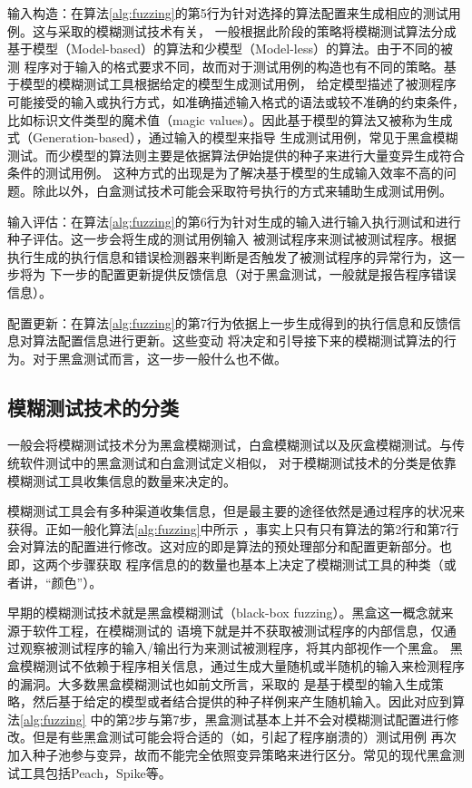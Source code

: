 \documentclass[bachelor]{njupthesis}
\begin{document}
输入构造：在算法\ref{alg:fuzzing}的第5行为针对选择的算法配置来生成相应的测试用例。这与采取的模糊测试技术有关，
一般根据此阶段的策略将模糊测试算法分成基于模型（Model-based）的算法和少模型（Model-less）的算法。由于不同的被测
程序对于输入的格式要求不同，故而对于测试用例的构造也有不同的策略。基于模型的模糊测试工具根据给定的模型生成测试用例，
给定模型描述了被测程序可能接受的输入或执行方式，如准确描述输入格式的语法或较不准确的约束条件，
比如标识文件类型的魔术值（magic values）。因此基于模型的算法又被称为生成式（Generation-based），通过输入的模型来指导
生成测试用例，常见于黑盒模糊测试。而少模型的算法则主要是依据算法伊始提供的种子来进行大量变异生成符合条件的测试用例。
这种方式的出现是为了解决基于模型的生成输入效率不高的问题。除此以外，白盒测试技术可能会采取符号执行的方式来辅助生成测试用例。

输入评估：在算法\ref{alg:fuzzing}的第6行为针对生成的输入进行输入执行测试和进行种子评估。这一步会将生成的测试用例输入
被测试程序来测试被测试程序。根据执行生成的执行信息和错误检测器来判断是否触发了被测试程序的异常行为，这一步将为
下一步的配置更新提供反馈信息（对于黑盒测试，一般就是报告程序错误信息）。

配置更新：在算法\ref{alg:fuzzing}的第7行为依据上一步生成得到的执行信息和反馈信息对算法配置信息进行更新。这些变动
将决定和引导接下来的模糊测试算法的行为。对于黑盒测试而言，这一步一般什么也不做。

\subsection{模糊测试技术的分类}
一般会将模糊测试技术分为黑盒模糊测试，白盒模糊测试以及灰盒模糊测试。与传统软件测试中的黑盒测试和白盒测试\cite{myers2011art}定义相似，
对于模糊测试技术的分类是依靠模糊测试工具收集信息的数量来决定的\cite{manes2019art}。

模糊测试工具会有多种渠道收集信息，但是最主要的途径依然是通过程序的状况来获得。正如一般化算法\ref{alg:fuzzing}中所示
，事实上只有只有算法的第2行和第7行会对算法的配置进行修改。这对应的即是算法的预处理部分和配置更新部分。也即，这两个步骤获取
程序信息的的数量也基本上决定了模糊测试工具的种类（或者讲，“颜色”）。

早期的模糊测试技术就是黑盒模糊测试\cite{beizer1995black}（black-box fuzzing）。黑盒这一概念就来源于软件工程，在模糊测试的
语境下就是并不获取被测试程序的内部信息，仅通过观察被测试程序的输入/输出行为来测试被测程序，将其内部视作一个黑盒。
黑盒模糊测试不依赖于程序相关信息，通过生成大量随机或半随机的输入来检测程序的漏洞。大多数黑盒模糊测试也如前文所言，采取的
是基于模型的输入生成策略，然后基于给定的模型或者结合提供的种子样例来产生随机输入。因此对应到算法\ref{alg:fuzzing}
中的第2步与第7步，黑盒测试基本上并不会对模糊测试配置进行修改。但是有些黑盒测试可能会将合适的（如，引起了程序崩溃的）测试用例
再次加入种子池参与变异，故而不能完全依照变异策略来进行区分。常见的现代黑盒测试工具包括Peach\cite{Peach}，Spike\cite{Spike}等。
\end{document}
